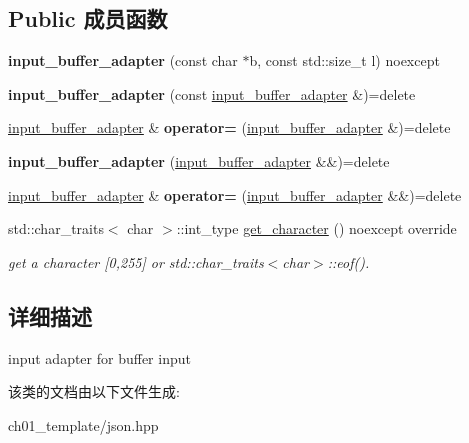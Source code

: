 \subsection*{Public 成员函数}
\begin{DoxyCompactItemize}
\item 
\mbox{\label{classnlohmann_1_1detail_1_1input__buffer__adapter_ad9b912fabdcb53de255e8c444d625ac3}} 
{\bfseries input\+\_\+buffer\+\_\+adapter} (const char $\ast$b, const std\+::size\+\_\+t l) noexcept
\item 
\mbox{\label{classnlohmann_1_1detail_1_1input__buffer__adapter_ada76d7b75c5d6b989af0e18687ef07b6}} 
{\bfseries input\+\_\+buffer\+\_\+adapter} (const \mbox{\hyperlink{classnlohmann_1_1detail_1_1input__buffer__adapter}{input\+\_\+buffer\+\_\+adapter}} \&)=delete
\item 
\mbox{\label{classnlohmann_1_1detail_1_1input__buffer__adapter_a0871125057d993684ba8e45fb2b8a76b}} 
\mbox{\hyperlink{classnlohmann_1_1detail_1_1input__buffer__adapter}{input\+\_\+buffer\+\_\+adapter}} \& {\bfseries operator=} (\mbox{\hyperlink{classnlohmann_1_1detail_1_1input__buffer__adapter}{input\+\_\+buffer\+\_\+adapter}} \&)=delete
\item 
\mbox{\label{classnlohmann_1_1detail_1_1input__buffer__adapter_ab6bc6bb785408b74af284a5b7544d9dc}} 
{\bfseries input\+\_\+buffer\+\_\+adapter} (\mbox{\hyperlink{classnlohmann_1_1detail_1_1input__buffer__adapter}{input\+\_\+buffer\+\_\+adapter}} \&\&)=delete
\item 
\mbox{\label{classnlohmann_1_1detail_1_1input__buffer__adapter_a19bb3ff68048a2fc8ecc41a013af37ae}} 
\mbox{\hyperlink{classnlohmann_1_1detail_1_1input__buffer__adapter}{input\+\_\+buffer\+\_\+adapter}} \& {\bfseries operator=} (\mbox{\hyperlink{classnlohmann_1_1detail_1_1input__buffer__adapter}{input\+\_\+buffer\+\_\+adapter}} \&\&)=delete
\item 
\mbox{\label{classnlohmann_1_1detail_1_1input__buffer__adapter_ae9e195b04f3551fafb0925aafba00124}} 
std\+::char\+\_\+traits$<$ char $>$\+::int\+\_\+type \mbox{\hyperlink{classnlohmann_1_1detail_1_1input__buffer__adapter_ae9e195b04f3551fafb0925aafba00124}{get\+\_\+character}} () noexcept override
\begin{DoxyCompactList}\small\item\em get a character \mbox{[}0,255\mbox{]} or std\+::char\+\_\+traits$<$char$>$\+::eof(). \end{DoxyCompactList}\end{DoxyCompactItemize}


\subsection{详细描述}
input adapter for buffer input 

该类的文档由以下文件生成\+:\begin{DoxyCompactItemize}
\item 
ch01\+\_\+template/json.\+hpp\end{DoxyCompactItemize}
